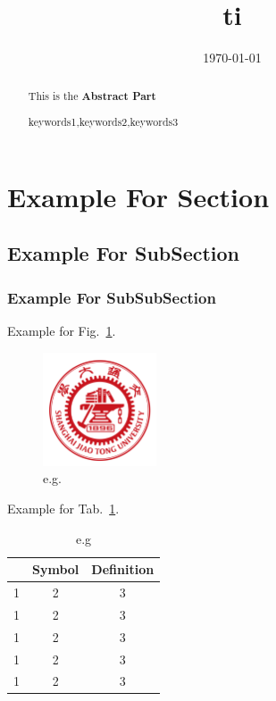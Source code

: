 \documentclass{mcmthesis}
\begin{document}
\linespread{0.6} %
\setlength{\parskip}{0.5\baselineskip} %
\title{ti}

\date{\today}
\begin{abstract}
 		This is the \textbf{Abstract Part}

	\begin{keywords}
	keywords1,keywords2,keywords3
	\end{keywords}
\end{abstract}

\maketitle

\tableofcontents

\section{Example For Section}


\subsection{Example For SubSection}


\subsubsection{Example For SubSubSection }

Example for Fig.~\ref{fig:eg1}.

\begin{figure}[H]
	\centering
	\includegraphics[width = 0.3\textwidth]{figure/figure1.png} 
	\caption{e.g.}
	\label{fig:eg1}
\end{figure}

Example for Tab.~\ref{tbl:eg1}.

\begin{table}[H]
	\centering
	\caption{e.g}
	\begin{tabular}{|c|c|c|}
	\toprule
	  & Symbol &Definition\\
	\midrule
	1 & 2 & 3\\	
	1 & 2 & 3\\
	1 & 2 & 3\\
	1 & 2 & 3\\
	1 & 2 & 3\\
	\bottomrule
	\end{tabular}
	\label{tbl:eg1}
\end{table}
\end{document}
